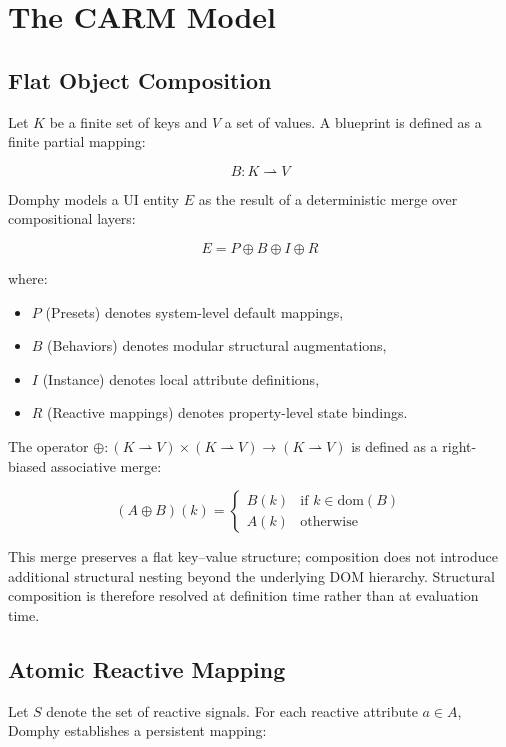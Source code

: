 \section{The CARM Model}

\subsection{Flat Object Composition}

Let $K$ be a finite set of keys and $V$ a set of values. 
A blueprint is defined as a finite partial mapping:

\[
B : K \rightharpoonup V
\]

Domphy models a UI entity $E$ as the result of a deterministic merge over compositional layers:

\[
E = P \oplus B \oplus I \oplus R
\]

where:

\begin{itemize}
    \item $P$ (Presets) denotes system-level default mappings,
    \item $B$ (Behaviors) denotes modular structural augmentations,
    \item $I$ (Instance) denotes local attribute definitions,
    \item $R$ (Reactive mappings) denotes property-level state bindings.
\end{itemize}

The operator $\oplus : (K \rightharpoonup V) \times (K \rightharpoonup V) \to (K \rightharpoonup V)$ 
is defined as a right-biased associative merge:

\[
(A \oplus B)(k) =
\begin{cases}
B(k) & \text{if } k \in \text{dom}(B) \\
A(k) & \text{otherwise}
\end{cases}
\]

This merge preserves a flat key–value structure; composition does not introduce additional structural nesting beyond the underlying DOM hierarchy. Structural composition is therefore resolved at definition time rather than at evaluation time.
\subsection{Atomic Reactive Mapping}

Let $S$ denote the set of reactive signals.
For each reactive attribute $a \in A$, Domphy establishes a persistent mapping:

